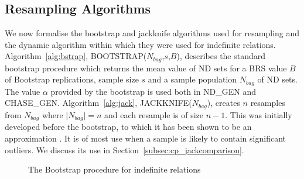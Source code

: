 \subsection{Resampling Algorithms}\label{sec:cp_resalg}

We now formalise the bootstrap and jackknife algorithms used for
resampling and the dynamic algorithm within which they were used for
indefinite relations.
Algorithm~\ref{alg:bstrap}, BOOTSTRAP($N_{bag}$,$s$,$B$),
describes the standard bootstrap procedure which returns the mean value
of ND sets for a BRS value $B$ of Bootstrap replications, sample size $s$ and a
sample population $N_{bag}$ of ND sets. The value $\alpha$
provided by the bootstrap is used both in ND\_GEN and CHASE\_GEN.
Algorithm~\ref{alg:jack}, JACKKNIFE($N_{bag}$), creates $n$ resamples
from $N_{bag}$ where $\mid N_{bag} \mid = n$ and each resample is of
size $n - 1$. This was initially developed before the bootstrap, to
which it has been shown to be an approximation \cite{et86}. It is of
most use when a sample is likely to contain significant outliers. We
discuss its use in Section~\ref{subsec:cp_jackcomparison}. 


{\line
\begin{figure}[ht]
\begin{center}
\caption{\label{cp:fig:bootstrap} The Bootstrap procedure for
indefinite relations}
\end{center}
\end{figure}
}


